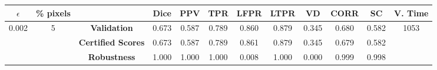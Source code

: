 \begin{longtable}{ c  c | c | c  c  c  c  c  c  c c c}
\toprule \textbf{$\epsilon$} & \textbf{\% pixels} & & \textbf{Dice} & \textbf{PPV} & \textbf{TPR} & \textbf{LFPR} & \textbf{LTPR} & \textbf{VD} & \textbf{CORR} & \textbf{SC} & \textbf{V. Time} \\
\midrule 
\multirow{3}{*}{0.002}  & \multirow{3}{*}{5} &\textbf{Validation} & 0.673 & 0.587 & 0.789 & 0.860 & 0.879 & 0.345 & 0.680 & 0.582 & \multirow{3}{*}{1053} \\
 & & \textbf{Certified Scores} & 0.673 & 0.587 & 0.789 & 0.861 & 0.879 & 0.345 & 0.679 & 0.582 & \\
& & \textbf{Robustness} & 1.000 & 1.000 & 1.000 & 0.008 & 1.000 & 0.000 & 0.999 & 0.998 & \\
\end{longtable}